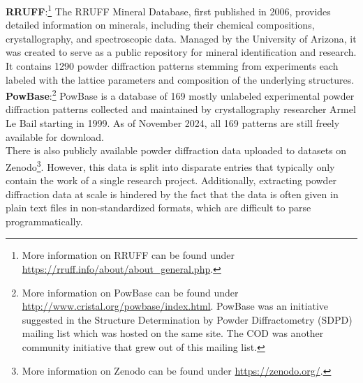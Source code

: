 \textbf{RRUFF}:\footnote{More information on RRUFF can be found under \url{https://rruff.info/about/about_general.php}.} The RRUFF Mineral Database, first published in 2006, provides detailed information on minerals, including their chemical compositions, crystallography, and spectroscopic data. Managed by the University of Arizona, it was created to serve as a public repository for mineral identification and research. It contains \num{1290} powder diffraction patterns stemming from experiments each labeled with the lattice parameters and composition of the underlying structures. \\

\textbf{PowBase}:\footnote{More information on PowBase can be found under \url{http://www.cristal.org/powbase/index.html}. PowBase was an initiative suggested in the Structure Determination by
Powder Diffractometry (SDPD) mailing list which was hosted on the same site. The COD was another community initiative that grew out of this mailing list.} PowBase is a database of 169 mostly unlabeled experimental powder diffraction patterns collected and maintained by crystallography researcher Armel Le Bail starting in 1999. As of November 2024, all 169 patterns are still freely available for download. \\


There is also publicly available powder diffraction data uploaded to datasets on Zenodo\footnote{More information on Zenodo can be found under \url{https://zenodo.org/}.}. However, this data is split into disparate entries that typically only contain the work of a single research project. Additionally, extracting powder diffraction data at scale is hindered by the fact that the data is often given in plain text files in non-standardized formats, which are difficult to parse programmatically. \\

